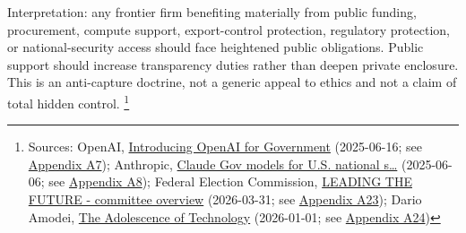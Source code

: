 \documentclass[
  american,
  11pt,
  letterpaper,
]{article}
\begin{document}
Interpretation: any frontier firm benefiting materially from public
funding, procurement, compute support, export-control protection,
regulatory protection, or national-security access should face
heightened public obligations. Public support should increase
transparency duties rather than deepen private enclosure. This is an
anti-capture doctrine, not a generic appeal to ethics and not a claim of
total hidden control. \footnote{Sources: OpenAI,
  \href{https://openai.com/global-affairs/introducing-openai-for-government/}{Introducing
  OpenAI for Government} (2025-06-16; see
  \hyperref[appendix-a7-introducing-openai-for-government]{Appendix
  A7}); Anthropic,
  \href{https://www.anthropic.com/news/claude-gov-models-for-u-s-national-security-customers}{Claude
  Gov models for U.S. national s\ldots{}} (2025-06-06; see
  \hyperref[appendix-a8-claude-gov-models-for-u-s-national-security-customers]{Appendix
  A8}); Federal Election Commission,
  \href{https://www.fec.gov/data/committee/C00916114/}{LEADING THE
  FUTURE - committee overview} (2026-03-31; see
  \hyperref[appendix-a23-leading-the-future-committee-overview]{Appendix
  A23}); Dario Amodei,
  \href{https://darioamodei.com/essay/the-adolescence-of-technology}{The
  Adolescence of Technology} (2026-01-01; see
  \hyperref[appendix-a24-the-adolescence-of-technology]{Appendix A24})}
\end{document}
